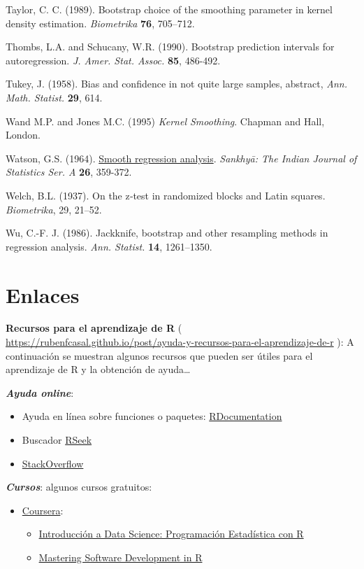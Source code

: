 \documentclass[
]{book}
\theoremstyle{break}
\theoremstyle{nonumberplain}
\begin{document}
Taylor, C. C. (1989). Bootstrap choice of the smoothing parameter in
kernel density estimation. \emph{Biometrika} \textbf{76}, 705--712.

Thombs, L.A. and Schucany, W.R. (1990). Bootstrap prediction intervals
for autoregression. \emph{J. Amer. Stat. Assoc.} \textbf{85}, 486-492.

Tukey, J. (1958). Bias and confidence in not quite large samples,
abstract, \emph{Ann. Math. Statist.} \textbf{29}, 614.

Wand M.P. and Jones M.C. (1995) \emph{Kernel Smoothing}. Chapman and Hall, London.

Watson, G.S. (1964). \href{https://www.jstor.org/stable/25049340?seq=1\#page_scan_tab_contents}{Smooth regression analysis}. \emph{Sankhy{ā}: The Indian Journal of Statistics Ser. A}
\textbf{26}, 359-372.

Welch, B.L. (1937). On the z‐test in randomized blocks and Latin squares. \emph{Biometrika}, 29, 21--52.

Wu, C.-F. J. (1986). Jackknife, bootstrap and other resampling methods
in regression analysis. \emph{Ann. Statist.} \textbf{14}, 1261--1350.

\appendix


\chapter{Enlaces}\label{links}

\textbf{Recursos para el aprendizaje de R} ( \url{https://rubenfcasal.github.io/post/ayuda-y-recursos-para-el-aprendizaje-de-r}
): A continuación se muestran algunos recursos que pueden ser útiles para el aprendizaje de R y la obtención de ayuda\ldots{}

\textbf{\emph{Ayuda online}}:

\begin{itemize}
\item
  Ayuda en línea sobre funciones o paquetes: \href{https://www.rdocumentation.org/}{RDocumentation}
\item
  Buscador \href{http://rseek.org/}{RSeek}
\item
  \href{http://stackoverflow.com/questions/tagged/r}{StackOverflow}
\end{itemize}

\textbf{\emph{Cursos}}:
algunos cursos gratuitos:

\begin{itemize}
\item
  \href{https://www.coursera.org/}{Coursera}:

  \begin{itemize}
  \item
    \href{https://www.coursera.org/learn/intro-data-science-programacion-estadistica-r}{Introducción a Data Science: Programación Estadística con R}
  \item
    \href{https://www.coursera.org/specializations/r}{Mastering Software Development in R}
  \end{itemize}
\end{itemize}
\end{document}
